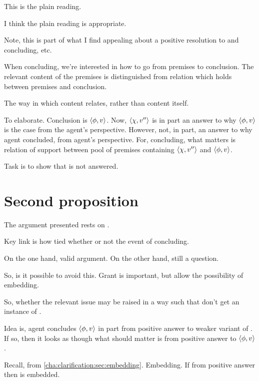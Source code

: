 \begin{note}
  This is the plain reading.

  I think the plain reading is appropriate.
\end{note}

\begin{note}[Aside]
  Note, this is part of what I find appealing about a positive resolution to \issueConstraint{} and concluding, etc.

  When concluding, we're interested in how to go from premises to conclusion.
  The relevant content of the premises is distinguished from relation which holds between premises and conclusion.

  The way in which content relates, rather than content itself.

  To elaborate.
  Conclusion is \(\langle \phi, v \rangle\).
  Now, \(\langle \chi, v'' \rangle\) is in part an answer to why \(\langle \phi, v \rangle\) is the case from the agent's perspective.
  However, not, in part, an answer to why agent concluded, from agent's perspective.
  For, concluding, what matters is relation of support between pool of premises containing \(\langle \chi, v'' \rangle\) and \(\langle \phi, v \rangle\).
\end{note}

\begin{note}
  Task is to show that \qzS{} is not answered.
\end{note}

\section{Second proposition}
\label{sec:flexible-argument}

\begin{note}
  The argument presented rests on \qzS{}.

  Key link is how \qzS{} tied whether or not \fc{} the event of concluding.

  On the one hand, valid argument.
  On the other hand, still a question.

  So, is it possible to avoid this.
  Grant \fc{} is important, but allow the possibility of embedding.

  So, whether the relevant issue may be raised in a way such that don't get an instance of \qzS{}.

  Idea is, agent concludes \(\langle \phi, v \rangle\) in part from positive answer to weaker variant of \qzS{}.
  If so, then it looks as though what should matter is \support{} from positive answer to \(\langle \phi, v \rangle\).

  Recall, from \autoref{cha:clarification:sec:embedding}.
  Embedding.
  If \support{} from positive answer then \support{} is embedded.
\end{note}

